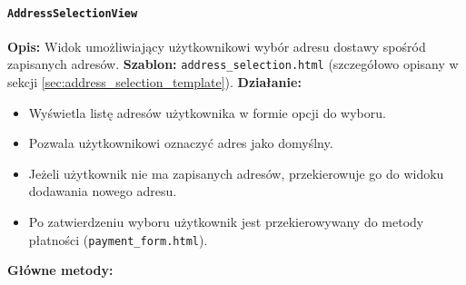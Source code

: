 \documentclass[12pt,a4paper,oneside]{article}
\theoremstyle{definition}
\numberwithin{equation}{section}
\begin{document}
\paragraph{\texttt{AddressSelectionView}}
\textbf{Opis:} Widok umożliwiający użytkownikowi wybór adresu dostawy spośród zapisanych adresów.  
\textbf{Szablon:} \texttt{address\_selection.html} (szczegółowo opisany w sekcji \ref{sec:address_selection_template}).  
\textbf{Działanie:}
\begin{itemize}
    \item Wyświetla listę adresów użytkownika w formie opcji do wyboru.
    \item Pozwala użytkownikowi oznaczyć adres jako domyślny.
    \item Jeżeli użytkownik nie ma zapisanych adresów, przekierowuje go do widoku dodawania nowego adresu.
    \item Po zatwierdzeniu wyboru użytkownik jest przekierowywany do metody płatności (\texttt{payment\_form.html}).
\end{itemize}
\textbf{Główne metody:}
\end{document}
